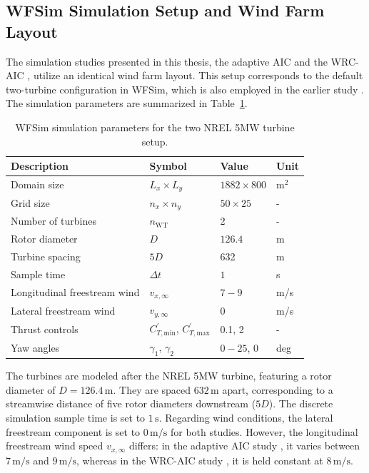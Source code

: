\subsection{WFSim Simulation Setup and Wind Farm Layout}
The simulation studies presented in this thesis, the adaptive AIC \cite{dittmer2022data} and the WRC-AIC \cite{dittmer2023koopman}, utilize an identical wind farm layout. This setup corresponds to the default two-turbine configuration in WFSim, which is also employed in the earlier study \cite{sharan2022Koopman}. The simulation parameters are summarized in Table~\ref{table:WfSim}. 
%
\begin{table}[ht]
    \centering
    \caption{WFSim simulation parameters for the two NREL 5MW turbine setup.}
    \label{table:WfSim}
    \begin{tabular}{l l l l} 
        \toprule
        Description & Symbol & Value & Unit\\
        \midrule
        Domain size &$L_x\times L_y$ & $1882\times 800$& $\text{m}^2$ \\
        Grid size  &$n_x\times n_y$ & $50\times 25$ & -\\
        Number of turbines& $n_{\text{WT}}$ & 2 & - \\
        Rotor diameter & $D$  & $126.4$& m \\
        Turbine spacing & $5D$ & 632 & m\\
        Sample time &$\Delta t$ & $1$ & s \\
        Longitudinal freestream wind &$v_{x,\infty}$&  $7 - 9$ & m/s \\
        Lateral freestream wind &$v_{y,\infty}$  & $0$ & m/s \\         
        Thrust controls & $C^{\prime}_{T,\text{min}}$, $C^{\prime}_{T,\text{max}}$ & 0.1, 2 & -\\
        Yaw angles &$\gamma_1$, $\gamma_2$ &  $0 - 25$, $0$ & deg\\
        \bottomrule
    \end{tabular}
\end{table}
%
The turbines are modeled after the NREL 5MW turbine, featuring a rotor diameter of $D = 126.4\,\text{m}$. They are spaced $632\,\text{m}$ apart, corresponding to a streamwise distance of five rotor diameters downstream ($5D$). The discrete simulation sample time is set to $1\,\text{s}$. Regarding wind conditions, the lateral freestream component is set to $0\,\text{m/s}$ for both studies. However, the longitudinal freestream wind speed $v_{x,\infty}$ differs: in the adaptive AIC study \cite{dittmer2022data}, it varies between $7\,\text{m/s}$ and $9\,\text{m/s}$, whereas in the WRC-AIC study \cite{dittmer2023koopman}, it is held constant at $8\,\text{m/s}$.


